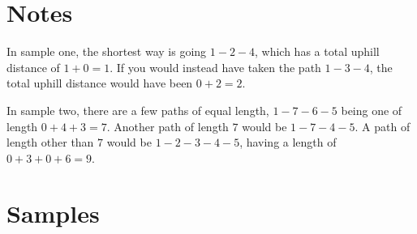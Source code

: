 \section*{Notes}

In sample one, the shortest way is going $1 - 2 - 4$, which has a total uphill distance of $1+0=1$.
If you would instead have taken the path $1 - 3 - 4$, the total uphill distance would have been
$0+2=2$.

In sample two, there are a few paths of equal length, $1 - 7 - 6 - 5$ being one of length $0+4+3=7$.
Another path of length $7$ would be $1 - 7 - 4 - 5$. A path of length other than $7$ would be
$1-2-3-4-5$, having a length of $0+3+0+6 = 9$.

\section*{Samples}
